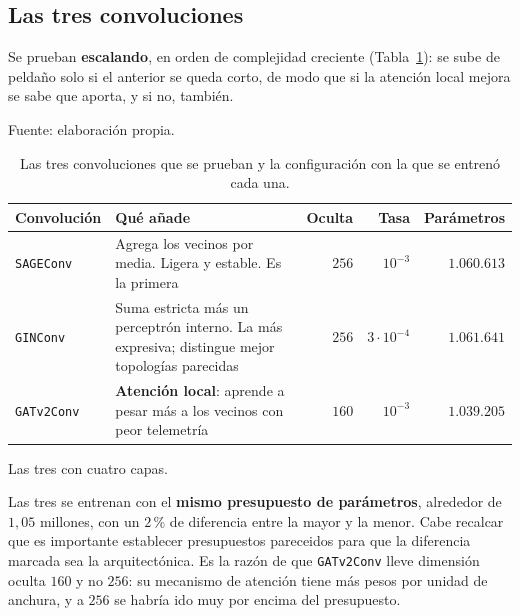 \subsection*{Las tres convoluciones}

Se prueban \textbf{escalando}, en orden de complejidad creciente (Tabla~\ref{tab:convs}): se
sube de peldaño solo si el anterior se queda corto, de modo que si la atención local mejora se
sabe que aporta, y si no, también.

\begin{table}[!ht]
    \centering
    \caption{Las tres convoluciones que se prueban y la configuración con la que se entrenó
             cada una.}
    \label{tab:convs}
    {\footnotesize
    Fuente: elaboración propia. \begin{tabular}{@{}p{}p{}rrr@{}}
        \toprule
        \textbf{Convolución} & \textbf{Qué añade} & \textbf{Oculta} & \textbf{Tasa}
            & \textbf{Parámetros} \\
        \midrule
        \texttt{SAGEConv} \cite{hamilton2017sage}
            & Agrega los vecinos por media. Ligera y estable. Es la primera
            & $256$ & $10^{-3}$ & $1{.}060{.}613$ \\
        \texttt{GINConv} \cite{xu2019gin}
            & Suma estricta más un perceptrón interno. La más expresiva; distingue mejor
              topologías parecidas
            & $256$ & $3\cdot10^{-4}$ & $1{.}061{.}641$ \\
        \texttt{GATv2Conv} \cite{brody2022gatv2}
            & \textbf{Atención local}: aprende a pesar más a los vecinos con peor telemetría
            & $160$ & $10^{-3}$ & $1{.}039{.}205$ \\
        \bottomrule
    \end{tabular}}

    {\footnotesize Las tres con cuatro capas.}
\end{table}

Las tres se entrenan con el \textbf{mismo presupuesto de parámetros}, alrededor de $1{,}05$
millones, con un $2$\,\% de diferencia entre la mayor y la menor. Cabe recalcar que es importante establecer presupuestos pareceidos para que la diferencia marcada sea la arquitectónica. Es la razón de que \texttt{GATv2Conv} lleve dimensión
oculta $160$ y no $256$: su mecanismo de atención tiene más pesos por unidad de anchura, y a
$256$ se habría ido muy por encima del presupuesto.

